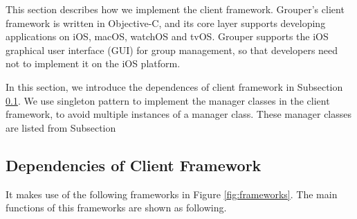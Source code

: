 \documentclass[a4paper,11pt]{report}
\begin{document}
This section describes how we implement the client framework.
Grouper's client framework is written in Objective-C, and its core layer supports developing applications on iOS, macOS, watchOS and tvOS.
Grouper supports the iOS graphical user interface (GUI) for group management, so that developers need not to implement it on the iOS platform.

In this section, we introduce the dependences of client framework in Subsection \ref{subsection:dependencies_client}.
We use singleton pattern to implement the manager classes in the client framework, to avoid multiple instances of a manager class.
These manager classes are listed from Subsection 

\subsection{Dependencies of Client Framework} \label{subsection:dependencies_client}

It makes use of the following frameworks in Figure \ref{fig:frameworks}.
The main functions of this frameworks are shown as following.
\end{document}
